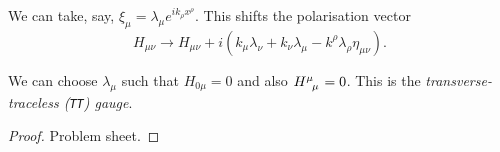 We can take, say, $\xi_{\mu} = \lambda_{\mu} e^{i k_{\rho} x^{\rho}}$. This shifts the polarisation vector
\begin{equation}
  H_{\mu\nu} \to H_{\mu\nu} + i (k_{\mu} \lambda_{\nu} + k_{\nu} \lambda_{\mu} - k^{\rho} \lambda_{\rho} \eta_{\mu\nu}).
\end{equation}

\begin{claim}
  We can choose $\lambda_{\mu}$ such that $H_{0\mu} = 0$ and also $H\indices{^{\mu}_{\mu}} = 0$.
  This is the \emph{transverse-traceless (\texttt{TT}) gauge}.
\end{claim}
\begin{proof}
  Problem sheet.
\end{proof}
